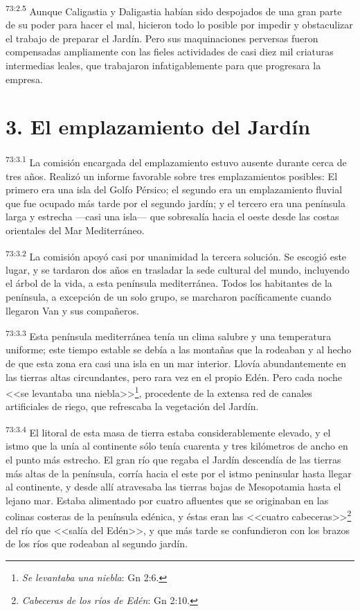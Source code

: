 \par
\textsuperscript{73:2.5} Aunque Caligastia y Daligastia habían sido despojados de una gran parte de su poder para hacer el mal, hicieron todo lo posible por impedir y obstaculizar el trabajo de preparar el Jardín. Pero sus maquinaciones perversas fueron compensadas ampliamente con las fieles actividades de casi diez mil criaturas intermedias leales, que trabajaron infatigablemente para que progresara la empresa.

\section*{3. El emplazamiento del Jardín}
\par
\textsuperscript{73:3.1} La comisión encargada del emplazamiento estuvo ausente durante cerca de tres años. Realizó un informe favorable sobre tres emplazamientos posibles: El primero era una isla del Golfo Pérsico; el segundo era un emplazamiento fluvial que fue ocupado más tarde por el segundo jardín; y el tercero era una península larga y estrecha ---casi una isla--- que sobresalía hacia el oeste desde las costas orientales del Mar Mediterráneo.

\par
\textsuperscript{73:3.2} La comisión apoyó casi por unanimidad la tercera solución. Se escogió este lugar, y se tardaron dos años en trasladar la sede cultural del mundo, incluyendo el árbol de la vida, a esta península mediterránea. Todos los habitantes de la península, a excepción de un solo grupo, se marcharon pacíficamente cuando llegaron Van y sus compañeros.

\par
\textsuperscript{73:3.3} Esta península mediterránea tenía un clima salubre y una temperatura uniforme; este tiempo estable se debía a las montañas que la rodeaban y al hecho de que esta zona era casi una isla en un mar interior. Llovía abundantemente en las tierras altas circundantes, pero rara vez en el propio Edén. Pero cada noche <<se levantaba una niebla>>\footnote{\textit{Se levantaba una niebla}: Gn 2:6.}, procedente de la extensa red de canales artificiales de riego, que refrescaba la vegetación del Jardín.

\par
\textsuperscript{73:3.4} El litoral de esta masa de tierra estaba considerablemente elevado, y el istmo que la unía al continente sólo tenía cuarenta y tres kilómetros de ancho en el punto más estrecho. El gran río que regaba el Jardín descendía de las tierras más altas de la península, corría hacia el este por el istmo peninsular hasta llegar al continente, y desde allí atravesaba las tierras bajas de Mesopotamia hasta el lejano mar. Estaba alimentado por cuatro afluentes que se originaban en las colinas costeras de la península edénica, y éstas eran las <<cuatro cabeceras>>\footnote{\textit{Cabeceras de los ríos de Edén}: Gn 2:10.} del río que <<salía del Edén>>, y que más tarde se confundieron con los brazos de los ríos que rodeaban al segundo jardín.

